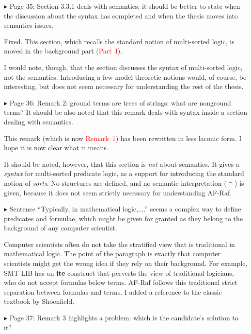 \documentclass{article}
\newcommand*\R[1]{\textcolor{red}{#1}} %
\newenvironment{them}%
  {\bigskip\noindent\begingroup\color{blue}$\blacktriangleright$\enspace}%
  {\endgroup\par}
\begin{document}
\begin{them}
Page 35:
Section 3.3.1 deals with semantics; it should be better to state when the
discussion about the syntax has completed and when the thesis moves into
semantics issues.
\end{them}
Fixed.
This section,
  which recalls the standard notion of multi-sorted logic,
  is moved in the background part (\R{Part~I}).

I would note, though,
  that the section discusses the syntax of multi-sorted logic,
  not the semantics.
Introducing a few model theoretic notions would, of course, be interesting,
  but does not seem necessary for understanding the rest of the thesis.

\begin{them}
Page 36:
Remark 2: ground terms are trees of strings; what are nonground terms? It
should be also noted that this remark deals with syntax inside a section
dealing with semantics.
\end{them}
This remark (which is now \R{Remark~1}) has been rewritten in less laconic
form. I hope it is now clear what it means.

It should be noted, however, that this section is \emph{not} about semantics.
It gives a \emph{syntax} for multi-sorted predicate logic,
  as a support for introducing the standard notion of \emph{sorts}.
No structures are defined, and no semantic interpretation ($\models$) is given,
  because it does not seem strictly necessary for understanding AF-Raf.


\begin{them}
Sentence ``Typically, in mathematical logic,....'' seems a complex way to define
predicates and formulae, which might be given for granted as they belong to the
background of any computer scientist.
\end{them}
Computer scientists often do not take the stratified view
  that is traditional in mathematical logic.
The point of the paragraph is exactly that computer scientists
  might get the wrong idea if they rely on their background.
For example, SMT-LIB has an {\bf ite} construct
  that perverts the view of traditional logicians,
    who do not accept formulas below terms.
AF-Raf follows this traditional strict separation between formulas and terms.
I added a reference to the classic textbook by Shoenfield.

\begin{them}
Page 37:
Remark 3 highlights a problem: which is the candidate's solution to it?
\end{them}
\end{document}
